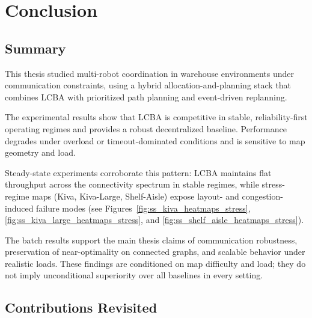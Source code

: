\chapter{Conclusion}
\label{chap:conclusion}



\section{Summary}
\label{sec:conclusion_summary}


This thesis studied multi-robot coordination in warehouse environments under
communication constraints, using a hybrid allocation-and-planning stack that
combines LCBA with prioritized path planning and event-driven replanning.

The experimental results show that LCBA is competitive in stable, reliability-first
operating regimes and provides a robust decentralized baseline. Performance
degrades under overload or timeout-dominated conditions and is sensitive to map
geometry and load.

Steady-state experiments corroborate this pattern: LCBA maintains flat
throughput across the connectivity spectrum in stable regimes, while
stress-regime maps (Kiva, Kiva-Large, Shelf-Aisle) expose layout- and
congestion-induced failure modes (see Figures~\ref{fig:ss_kiva_heatmaps_stress},
\ref{fig:ss_kiva_large_heatmaps_stress}, and \ref{fig:ss_shelf_aisle_heatmaps_stress}).

The batch results support the main thesis claims of communication robustness,
preservation of near-optimality on connected graphs, and scalable behavior
under realistic loads. These findings are conditioned on map difficulty and
load; they do not imply unconditional superiority over all baselines in every
setting.


\section{Contributions Revisited}
\label{sec:conclusion_contributions}

